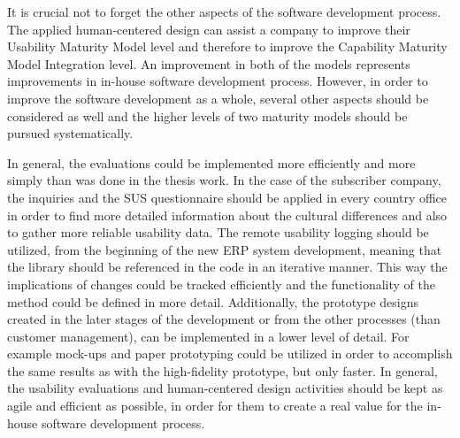 \documentclass[12pt,a4paper,oneside,pdftex]{report}
\begin{document}
It is crucial not to forget the other aspects of the software development process. The applied human-centered design can assist a company to improve their Usability Maturity Model level and therefore to improve the Capability Maturity Model Integration level. An improvement in both of the models represents improvements in in-house software development process. However, in order to improve the software development as a whole, several other aspects should be considered as well and the higher levels of two maturity models should be pursued systematically.

In general, the evaluations could be implemented more efficiently and more simply than was done in the thesis work. In the case of the subscriber company, the inquiries and the SUS questionnaire should be applied in every country office in order to find more detailed information about the cultural differences and also to gather more reliable usability data. The remote usability logging should be utilized, from the beginning of the new ERP system development, meaning that the library should be referenced in the code in an iterative manner. This way the implications of changes could be tracked efficiently and the functionality of the method could be defined in more detail. Additionally, the prototype designs created in the later stages of the development or from the other processes (than customer management), can be implemented in a lower level of detail. For example mock-ups and paper prototyping could be utilized in order to accomplish the same results as with the high-fidelity prototype, but only faster. In general, the usability evaluations and human-centered design activities should be kept as agile and efficient as possible, in order for them to create a real value for the in-house software development process.  
 

%
\end{document}
